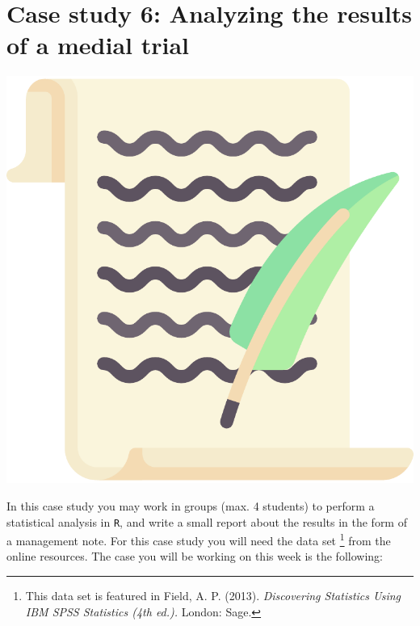 
\begin{minipage}{0.8\textwidth}
\section{Case study 6: Analyzing the results of a medial trial}
\end{minipage}%
\hfill%
\begin{minipage}{0.1\textwidth}
\includegraphics[width=\linewidth]{Files/Images/lettericon.pdf}
\end{minipage}
\vspace*{.1cm}

In this case study you may work in groups (max. 4 students) to perform a statistical analysis in \texttt{R}, and write a small report about the results in the form of a management note. For this case study you will need the data set \footnote{This data set is featured in Field, A. P. (2013). \textit{Discovering Statistics Using IBM SPSS Statistics (4th ed.).} London: Sage.} from the online resources. The case you will be working on this week is the following: \\

